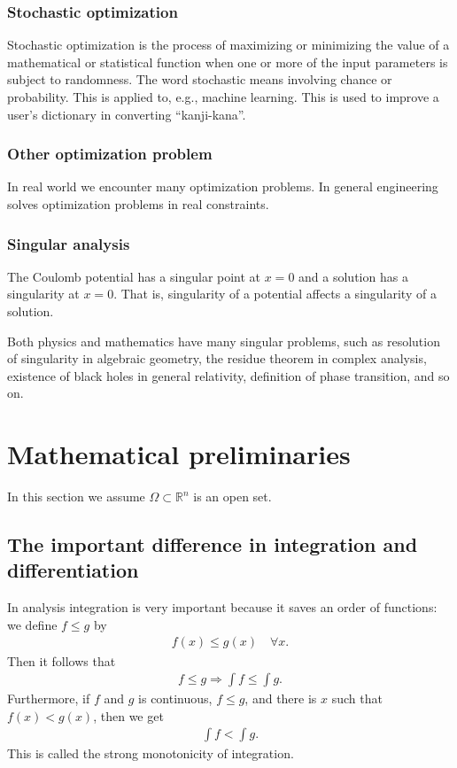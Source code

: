 \documentclass[openany, a4paper, oneside]{jsbook}
\theoremstyle{break}
\theoremstyle{breakdefn}
\newcommand{\bbRn}{\mathbb{R}^n}
\begin{document}
\subsubsection{Stochastic optimization}


Stochastic optimization is the process of maximizing or minimizing
the value of a mathematical or statistical function when one or more of the input parameters is subject to randomness.
The word stochastic means involving chance or probability.
This is applied to, e.g., machine learning.
This is used to improve a user's dictionary in converting ``kanji-kana''.
\subsubsection{Other optimization problem}


In real world we encounter many optimization problems.
In general engineering solves optimization problems in real constraints.
\subsubsection{Singular analysis}


The Coulomb potential has a singular point at $x = 0$ and a solution has a singularity at $x = 0$.
That is, singularity of a potential affects a singularity of a solution.

Both physics and mathematics have many singular problems,
such as resolution of singularity in algebraic geometry,
the residue theorem in complex analysis,
existence of black holes in general relativity, definition of phase transition, and so on.
\section{Mathematical preliminaries}


In this section we assume $\Omega \subset \bbRn$ is an open set.
\subsection{The important difference in integration and differentiation}


In analysis integration is very important because it saves an order of functions:
we define $f \leq g$ by
\begin{align}
 f (x) \leq g (x) \quad \forall x.
\end{align}
Then it follows that
\begin{align}
 f \leq g
 \Rightarrow
 \int f \leq \int g.
\end{align}
Furthermore, if $f$ and $g$ is continuous, $f \leq g$, and there is $x$ such that $f (x) < g (x)$, then we get
\begin{align}
 \int f < \int g.
\end{align}
This is called the strong monotonicity of integration.
\end{document}

